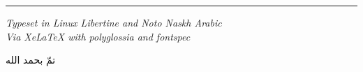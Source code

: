 \documentclass[11pt,a4paper]{book}
\begin{document}
\vfill

\begin{center}
\rule{0.3\textwidth}{0.4pt}

\vspace{0.3cm}

{\small\textit{Typeset in Linux Libertine and Noto Naskh Arabic}}\\[0.1cm]
{\small\textit{Via XeLaTeX with polyglossia and fontspec}}

\vspace{0.3cm}

\begin{arabicbox}[boxrule=0pt,colback=white,width=0.6\textwidth]
\begin{center}
\begin{Arabic}
تمّ بحمد الله
\end{Arabic}
\end{center}
\end{arabicbox}
\end{center}
\end{document}
